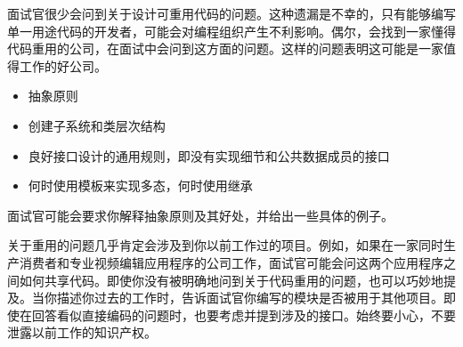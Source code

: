 
面试官很少会问到关于设计可重用代码的问题。这种遗漏是不幸的，只有能够编写单一用途代码的开发者，可能会对编程组织产生不利影响。偶尔，会找到一家懂得代码重用的公司，在面试中会问到这方面的问题。这样的问题表明这可能是一家值得工作的好公司。


\begin{itemize}
\item
抽象原则

\item
创建子系统和类层次结构

\item
良好接口设计的通用规则，即没有实现细节和公共数据成员的接口

\item
何时使用模板来实现多态，何时使用继承
\end{itemize}


面试官可能会要求你解释抽象原则及其好处，并给出一些具体的例子。

关于重用的问题几乎肯定会涉及到你以前工作过的项目。例如，如果在一家同时生产消费者和专业视频编辑应用程序的公司工作，面试官可能会问这两个应用程序之间如何共享代码。即使你没有被明确地问到关于代码重用的问题，也可以巧妙地提及。当你描述你过去的工作时，告诉面试官你编写的模块是否被用于其他项目。即使在回答看似直接编码的问题时，也要考虑并提到涉及的接口。始终要小心，不要泄露以前工作的知识产权。
















